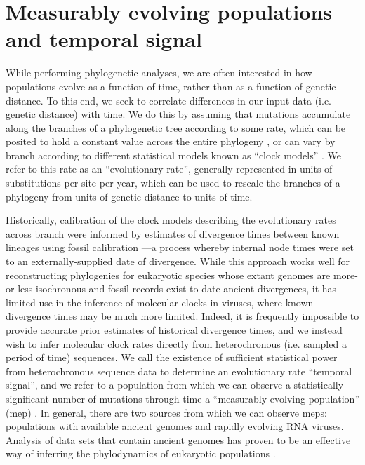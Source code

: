 \section{Measurably evolving populations and temporal signal}

While performing phylogenetic analyses, we are often interested in how populations evolve as a function of time, rather than as a function of genetic distance.
To this end, we seek to correlate differences in our input data (i.e. genetic distance) with time.
We do this by assuming that mutations accumulate along the branches of a phylogenetic tree according to some rate, which can be posited to hold a constant value across the entire phylogeny \cite{brown2011rate}, or can vary by branch according to different statistical models known as ``clock models'' \cite{drummond2006relaxed, drummond2010randomLocal}.
We refer to this rate as an ``evolutionary rate'', generally represented in units of substitutions per site per year, which can be used to rescale the branches of a phylogeny from units of genetic distance to units of time.

Historically, calibration of the clock models describing the evolutionary rates across branch were informed by estimates of divergence times between known lineages using fossil calibration \cite{pauling1963chemical, zuckerkandl1965molecules, near2005turtles}---a process whereby internal node times were set to an externally-supplied date of divergence.
While this approach works well for reconstructing phylogenies for eukaryotic species whose extant genomes are more-or-less isochronous and fossil records exist to date ancient divergences, it has limited use in the inference of molecular clocks in viruses, where known divergence times may be much more limited.
Indeed, it is frequently impossible to provide accurate prior estimates of historical divergence times, and we instead wish to infer molecular clock rates directly from heterochronous (i.e. sampled a period of time) sequences.
We call the existence of sufficient statistical power from heterochronous sequence data to determine an evolutionary rate ``temporal signal'', and we refer to a population from which we can observe a statistically significant number of mutations through time a ``measurably evolving population'' (\gls{mep}) \cite{drummond2003measurably}.
In general, there are two sources from which we can observe \gls{mep}s: populations with available ancient genomes and rapidly evolving RNA viruses.
Analysis of data sets that contain ancient genomes has proven to be an effective way of inferring the phylodynamics of eukaryotic populations \cite{shapiro2004bison}. %

